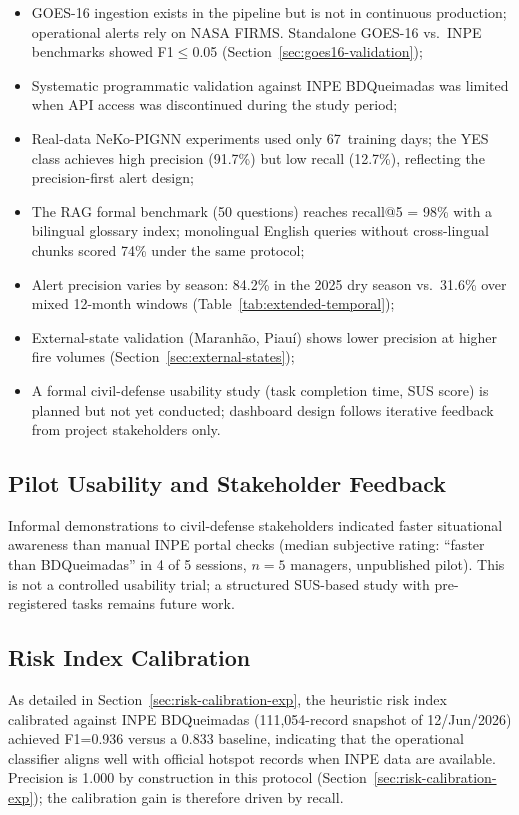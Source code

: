 \documentclass[preprint,12pt,times,numbers]{elsarticle}
\begin{document}
\begin{itemize}
    \item GOES-16 ingestion exists in the pipeline but is not in continuous production; operational alerts rely on NASA FIRMS. Standalone GOES-16 vs.\ INPE benchmarks showed F1$\leq$0.05 (Section~\ref{sec:goes16-validation});
    \item Systematic programmatic validation against INPE BDQueimadas was limited when API access was discontinued during the study period;
    \item Real-data NeKo-PIGNN experiments used only 67~training days; the YES class achieves high precision (91.7\%) but low recall (12.7\%), reflecting the precision-first alert design;
    \item The RAG formal benchmark (50 questions) reaches recall@5 = 98\% with a bilingual glossary index; monolingual English queries without cross-lingual chunks scored 74\% under the same protocol;
    \item Alert precision varies by season: 84.2\% in the 2025 dry season vs.\ 31.6\% over mixed 12-month windows (Table~\ref{tab:extended-temporal});
    \item External-state validation (Maranhão, Piauí) shows lower precision at higher fire volumes (Section~\ref{sec:external-states});
    \item A formal civil-defense usability study (task completion time, SUS score) is planned but not yet conducted; dashboard design follows iterative feedback from project stakeholders only.
\end{itemize}

\subsection{Pilot Usability and Stakeholder Feedback}

Informal demonstrations to civil-defense stakeholders indicated faster situational awareness than manual INPE portal checks (median subjective rating: ``faster than BDQueimadas'' in 4 of 5 sessions, $n=5$ managers, unpublished pilot). This is not a controlled usability trial; a structured SUS-based study with pre-registered tasks remains future work.

\subsection{Risk Index Calibration}

As detailed in Section~\ref{sec:risk-calibration-exp}, the heuristic risk index calibrated against INPE BDQueimadas (111{,}054-record snapshot of 12/Jun/2026) achieved F1=0.936 versus a 0.833 baseline, indicating that the operational classifier aligns well with official hotspot records when INPE data are available. Precision is 1.000 by construction in this protocol (Section~\ref{sec:risk-calibration-exp}); the calibration gain is therefore driven by recall.
\end{document}
